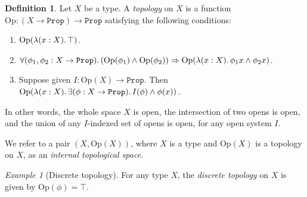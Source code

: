 \documentclass[11pt, oneside, article]{memoir}
\theoremstyle{plain}
\theoremstyle{definition}
\newtheorem{definition}[theorem]{Definition}
\theoremstyle{remark}
\newtheorem{example}[theorem]{Example}
\newcommand{\const}[1]{\mathtt{#1}}
\newcommand{\Set}[1]{\mathrm{#1}}
\newcommand{\Prop}{\const{Prop}}
\newcommand{\Op}{\Set{Op}}
\newcommand{\imp}{\Rightarrow}
\begin{document}
\begin{definition}
\label{internal_space}
Let $X$ be a type. A \emph{topology} on $X$ is a function $\Op:(X\to\Prop)\to\Prop$ satisfying the following conditions:
\begin{enumerate}
	\item $\Op(\lambda(x:X)\ldotp\top)$.
	\item $\forall(\phi_1,\phi_2:X\to\Prop)\ldotp(\Op(\phi_1)\wedge\Op(\phi_2))\imp\Op(\lambda(x:X)\ldotp\phi_1 x\wedge\phi_2 x)$.
	\item Suppose given $I: \Op(X) \to \Prop$. Then $\Op(\lambda(x:X)\ldotp\exists(\phi:X\to\Prop)\ldotp I(\phi)\wedge\phi (x))$.
\end{enumerate}
In other words, the whole space $X$ is open, the intersection of two opens is open, and the union of any $I$-indexed set of opens is open, for any open system $I$. %

We refer to a pair $(X,\Op(X))$, where $X$ is a type and $\Op(X)$ is a topology on $X$, as an \emph{internal topological space}.
\end{definition}

\begin{example}[Discrete topology]
For any type $X$, the \emph{discrete topology} on $X$ is given by $\Op(\phi)=\top$.
\end{example}
\end{document}
